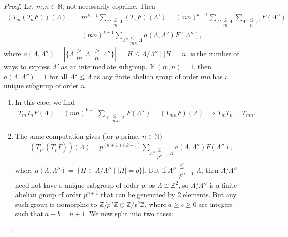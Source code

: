 \documentclass{article}
\theoremstyle{definition}
\begin{document}
\begin{proof}
    Let $m,n \in \mathbb{N}$, not necessarily coprime. Then 
    \begin{align*}
        (T_m(T_nF))(\Lambda) &= m^{k-1}\sum_{\Lambda' \substack{\le  \\ m} \Lambda}(T_nF)(\Lambda') = (mn)^{k-1}\sum_{\Lambda' \substack{\le  \\ m} \Lambda}\sum_{\Lambda'' \substack{\le  \\ n} \Lambda'} F(\Lambda'') \\
        &=(mn)^{k-1} \sum_{\Lambda'' \substack{\le  \\ mn} \Lambda}a(\Lambda,\Lambda'')F(\Lambda''),
    \end{align*}
    where $a(\Lambda, \Lambda'') = |\{\Lambda \substack{\ge \\ m} \Lambda' \substack{\ge \\ n} \Lambda''\}| = |H \le \Lambda/\Lambda'' \mid |H| = n|$ is the number of ways to express $\Lambda'$ as an intermediate subgroup. If $(m,n) = 1$, then $a(\Lambda,\Lambda'') = 1$ for all $\Lambda'' \le \Lambda$ as any finite abelian group of order $mn$ has a unique subgroup of order $n$.
    \begin{enumerate}[(1)]
        \item In this case, we find 
        \begin{align*}
            T_m T_nF(\Lambda) = (mn)^{k-1} \sum_{\Lambda'' \substack{\le  \\ mn} \Lambda} F(\Lambda'') = (T_{mn}F)(\Lambda) \implies T_mT_n = T_{mn}.
        \end{align*}
        \item The same computation gives (for $p$ prime, $n \in \mathbb{N}$)
        \begin{align*}
            (T_{p^n}(T_p F))(\Lambda) = p^{(n+1)(k-1)} \sum_{\Lambda'' \substack{\le  \\ p^{n+1}} \Lambda} a(\Lambda,\Lambda'')F(\Lambda''),
        \end{align*}
        where $a(\Lambda,\Lambda'') = |\{H \subset \Lambda/\Lambda'' \mid |H| = p\}|$. But if $\Lambda'' \substack{\le \\ p^{n+1}} \Lambda$, then $\Lambda/\Lambda''$ need not have a unique subgroup of order $p$, as $\Lambda \cong \mathbb{Z}^2$, so $\Lambda/\Lambda''$ is a finite abelian group of order $p^{n+1}$ that can be generated by 2 elements. But any such group is isomorphic to $\mathbb{Z}/p^a\mathbb{Z} \oplus \mathbb{Z}/p^b \mathbb{Z}$, where $a\ge b\ge 0$ are integers such that $a + b = n + 1$. We now split into two cases:

\end{enumerate}
\end{proof}
\end{document}
